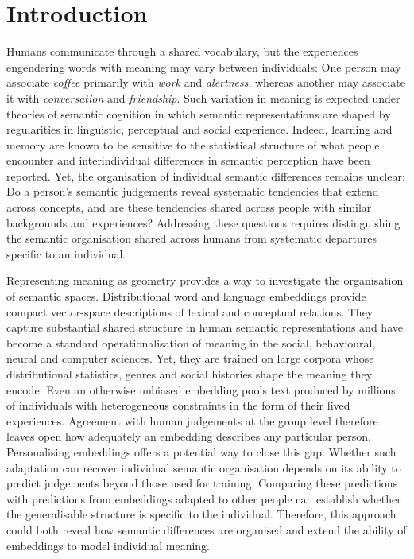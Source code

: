 \documentclass[pdflatex,sn-mathphys]{sn-jnl}
\begin{document}
\linenumbers

\section{Introduction}\label{introduction}
Humans communicate through a shared vocabulary, but the experiences engendering words with meaning may vary between individuals\cite{Johns2024,Marti2023,Guitard2027,Schwartz2013,Jansen2026}: One person may associate \textit{coffee} primarily with \textit{work} and \textit{alertness}, whereas another may associate it with \textit{conversation} and \textit{friendship}. Such variation in meaning is expected under theories of semantic cognition in which semantic representations are shaped by regularities in linguistic, perceptual and social experience\cite{Binder2011,Meteyard2012,Reilly2025}. Indeed, learning and memory are known to be sensitive to the statistical structure of what people encounter\cite{Summerfield2025,Cain2025} and interindividual differences in semantic perception have been reported\cite{Johns2024,Marti2023}. Yet, the organisation of individual semantic differences remains unclear: Do a person's semantic judgements reveal systematic tendencies that extend across concepts, and are these tendencies shared across people with similar backgrounds and experiences? Addressing these questions requires distinguishing the semantic organisation shared across humans from systematic departures specific to an individual.

Representing meaning as geometry provides a way to investigate the organisation of semantic spaces\cite{glove,Gentzkow2019}. Distributional word and language embeddings provide compact vector-space descriptions of lexical and conceptual relations\cite{glove}. They capture substantial shared structure in human semantic representations\cite{Goldstein2024,Kumar2024,Mischler2024} and have become a standard operationalisation of meaning in the social\cite{Xu2026,Kozlowski2019,Caliskan2017,Freden2024,Garg2017,Rheault2020}, behavioural\cite{Grand2022,Olson2021,Wulff2025,Lee2025}, neural\cite{Huth2016,Heilbronetal2022,King2025,Tang2023,Tang2025} and computer sciences\cite{Karpukhin2020,Radford2021,Reimers2019}. Yet, they are trained on large corpora whose distributional statistics, genres and social histories shape the meaning they encode\cite{Bender2021,Atari2023,Paullada2021}. Even an otherwise unbiased embedding pools text produced by millions of individuals with heterogeneous constraints in the form of their lived experiences\cite{Atari2023,Bosch2026}. Agreement with human judgements at the group level therefore leaves open how adequately an embedding describes any particular person. Personalising embeddings offers a potential way to close this gap. Whether such adaptation can recover individual semantic organisation depends on its ability to predict judgements beyond those used for training. Comparing these predictions with predictions from embeddings adapted to other people can establish whether the generalisable structure is specific to the individual. Therefore, this approach could both reveal how semantic differences are organised and extend the ability of embeddings to model individual meaning.
\end{document}
